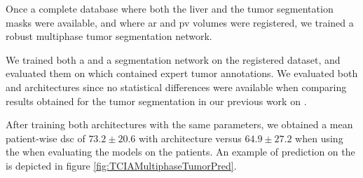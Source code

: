 Once a complete database where both the liver and the tumor segmentation
masks were available, and where \ac{ar} and \ac{pv} volumes were registered, we
trained a robust multiphase tumor segmentation network.

We trained both a  and a  segmentation network on the
registered \textbf{} dataset, and evaluated them on  which
contained expert tumor annotations. We evaluated both  and 
architectures since no statistical differences were available when
comparing results obtained for the tumor segmentation in our previous
work on \textbf{} \cite{Ouhmich2019}.

After training both architectures with
the same parameters, we obtained a mean patient-wise \ac{dsc} of $ 73.2 \pm 20.6 $ with 
architecture versus $ 64.9 \pm 27.2 $ when using the  when evaluating the
models on the \textbf{} patients. An example of prediction on the \textbf{} is
depicted in figure \ref{fig:TCIAMultiphaseTumorPred}.

